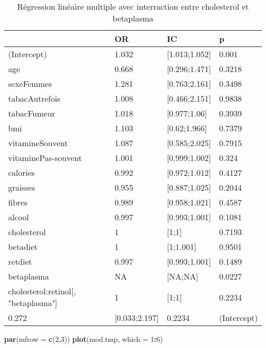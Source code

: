 \documentclass[]{article}
\newenvironment{Shaded}{\begin{snugshade}}{\end{snugshade}}
\newcommand{\KeywordTok}[1]{\textcolor[rgb]{0.13,0.29,0.53}{\textbf{#1}}}
\newcommand{\DataTypeTok}[1]{\textcolor[rgb]{0.13,0.29,0.53}{#1}}
\newcommand{\DecValTok}[1]{\textcolor[rgb]{0.00,0.00,0.81}{#1}}
\newcommand{\OperatorTok}[1]{\textcolor[rgb]{0.81,0.36,0.00}{\textbf{#1}}}
\newcommand{\NormalTok}[1]{#1}
\begin{document}
\begin{table}

\caption{\label{tab:unnamed-chunk-92}Régression linéaire multiple avec interraction entre cholesterol et betaplasma}
\centering
\begin{tabular}[t]{l|l|l|l}
\hline
  & OR & IC & p\\
\hline
\rowcolor[HTML]{BBD2E1}  (Intercept) & 1.032 & [1.013;1.052] & 0.001\\
\hline
age & 0.668 & [0.296;1.471] & 0.3218\\
\hline
\rowcolor[HTML]{BBD2E1}  sexeFemmes & 1.281 & [0.763;2.161] & 0.3498\\
\hline
tabacAutrefois & 1.008 & [0.466;2.151] & 0.9838\\
\hline
\rowcolor[HTML]{BBD2E1}  tabacFumeur & 1.018 & [0.977;1.06] & 0.3939\\
\hline
bmi & 1.103 & [0.62;1.966] & 0.7379\\
\hline
\rowcolor[HTML]{BBD2E1}  vitamineSouvent & 1.087 & [0.585;2.025] & 0.7915\\
\hline
vitaminePas-souvent & 1.001 & [0.999;1.002] & 0.324\\
\hline
\rowcolor[HTML]{BBD2E1}  calories & 0.992 & [0.972;1.012] & 0.4127\\
\hline
graisses & 0.955 & [0.887;1.025] & 0.2044\\
\hline
\rowcolor[HTML]{BBD2E1}  fibres & 0.989 & [0.958;1.021] & 0.4587\\
\hline
alcool & 0.997 & [0.993;1.001] & 0.1081\\
\hline
\rowcolor[HTML]{BBD2E1}  cholesterol & 1 & [1;1] & 0.7193\\
\hline
betadiet & 1 & [1;1.001] & 0.9501\\
\hline
\rowcolor[HTML]{BBD2E1}  retdiet & 0.997 & [0.993;1.001] & 0.1489\\
\hline
betaplasma & NA & [NA;NA] & 0.0227\\
\hline
\rowcolor[HTML]{BBD2E1}  cholesterol:retinol[, "betaplasma"] & 1 & [1;1] & 0.2234\\
\hline
0.272 & [0.033;2.197] & 0.2234 & (Intercept)\\
\hline
\end{tabular}
\end{table}

\begin{Shaded}
\begin{Highlighting}[]
\KeywordTok{par}\NormalTok{(}\DataTypeTok{mfrow =} \KeywordTok{c}\NormalTok{(}\DecValTok{2}\NormalTok{,}\DecValTok{3}\NormalTok{))}
\KeywordTok{plot}\NormalTok{(mod.tmp, }\DataTypeTok{which =} \DecValTok{1}\OperatorTok{:}\DecValTok{6}\NormalTok{)}
\end{Highlighting}
\end{Shaded}
\end{document}
